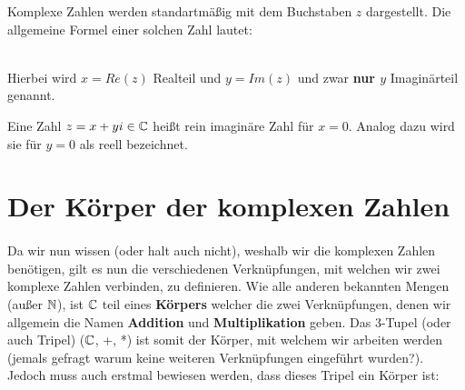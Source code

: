 	\begin{Definition}
		Komplexe Zahlen werden standartmäßig mit dem Buchstaben $z$ dargestellt. Die allgemeine Formel einer solchen Zahl lautet:
		\\
		\\
		Hierbei wird $x = Re(z)$ Realteil und $y = Im(z)$ und zwar \textbf{nur $y$} Imaginärteil genannt.
	\end{Definition}

	\begin{Bemerkung}
		Eine Zahl $z = x + yi \in \mathbb{C}$ heißt rein imaginäre Zahl für $x = 0$. Analog dazu wird sie für $y = 0$ als reell bezeichnet.
	\end{Bemerkung}


\section{Der Körper der komplexen Zahlen}

	\paragraph{} Da wir nun wissen (oder halt auch nicht), weshalb wir die komplexen Zahlen benötigen, gilt es nun die verschiedenen Verknüpfungen, mit welchen wir zwei komplexe Zahlen verbinden, zu definieren. Wie alle anderen bekannten Mengen (außer $\mathbb{N}$), ist $\mathbb{C}$ teil eines \textbf{Körpers} welcher die zwei Verknüpfungen, denen wir allgemein die Namen \textbf{Addition} und \textbf{Multiplikation} geben. Das 3-Tupel (oder auch Tripel) ($\mathbb{C}$, +, *) ist somit der Körper, mit welchem wir arbeiten werden (jemals gefragt warum keine weiteren Verknüpfungen eingeführt wurden?). Jedoch muss auch erstmal bewiesen werden, dass dieses Tripel ein Körper ist:


